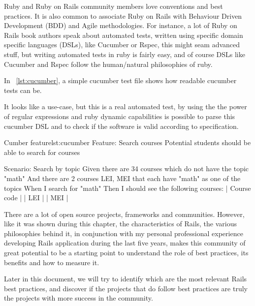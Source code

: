 Ruby and Ruby on Rails community members love conventions and best practices.
It is also common to associate Ruby on Rails with Behaviour Driven Development (BDD) and Agile methodologies.
For instance, a lot of Ruby on Rails book authors speak about automated tests, 
written using specific domain specific languages (DSLs), like Cucumber or Rspec, 
this might seam advanced stuff, but writing automated tests in ruby is fairly easy,
and of course DSLs like Cucumber and Rspec follow the human/natural philosophies of ruby.

In ~\ref{lst:cucumber}, a simple cucumber test file shows how readable cucumber tests can be.

It looks like a use-case, but this is a real automated test, 
by using the the power of regular expressions and ruby dynamic capabilities
is possible to parse this cucumber DSL and to check if the software is valid according to specification. 

\begin{rubycode}{Cumber feature}{lst:cucumber}
Feature: Search courses
  Potential students should be able to search for courses

  Scenario: Search by topic
    Given there are 34 courses which do not have the topic "math"
    And there are 2 courses LEI, MEI that each have "math" as one of the topics
    When I search for "math"
    Then I should see the following courses:
      | Course code |
      | LEI         |
      | MEI         |
\end{rubycode}

There are a lot of open source projects, frameworks and communities. 
However, like it was shown during this chapter, the characteristics of Rails, the various philosophies behind it,
in conjunction with my personal professional experience developing Rails application during the last five years,
makes this community of great potential to be a starting point to understand the role of best practices, 
its benefits and how to measure it. 

Later in this document, we will try to identify which are the most relevant Rails best practices,
and discover if the projects that do follow best practices are truly the projects with more success in the community.


